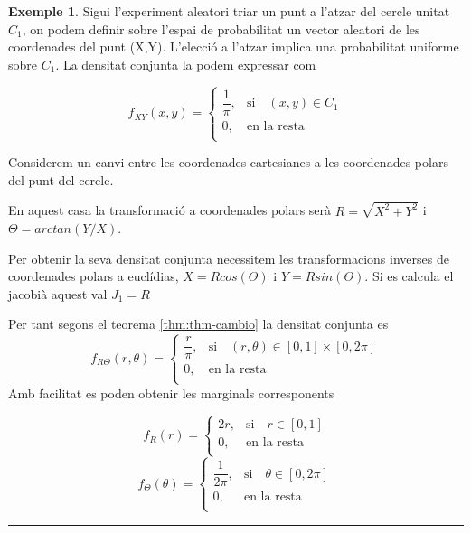 \documentclass[
  catalan,
]{article}
\theoremstyle{definition}
\theoremstyle{definition}
\newtheorem{example}{Exemple}[section]
\theoremstyle{definition}
\theoremstyle{definition}
\theoremstyle{remark}
\begin{document}
\begin{example}
\protect\hypertarget{exm:circulo}{}\label{exm:circulo}Sigui l'experiment aleatori triar un punt a l'atzar del cercle unitat \(C_1\), on podem definir sobre l'espai de probabilitat un vector aleatori de les coordenades del punt (X,Y). L'elecció a l'atzar implica una probabilitat uniforme sobre \(C_1\). La densitat conjunta la podem expressar com

\[
 f_{XY}(x,y)=
 \begin{cases}
\dfrac{1}{\pi},          & \text{si} \quad (x,y) \in C_1 \\
0,          & \text{en la resta }  \\
\end{cases}
 \]

Considerem un canvi entre les coordenades cartesianes a les coordenades polars del punt del cercle.

En aquest casa la transformació a coordenades polars serà \(R= \sqrt{X^2+Y^2}\) i \(\Theta=arctan (Y/X)\).

Per obtenir la seva densitat conjunta necessitem les transformacions inverses de coordenades polars a euclídias, \(X=R cos(\Theta)\) i \(Y=R sin(\Theta)\). Si es calcula el jacobià aquest val \(J_1=R\)

Per tant segons el teorema \ref{thm:thm-cambio} la densitat conjunta es
\[
 f_{R\Theta}(r,\theta)=
 \begin{cases}
\dfrac{r}{\pi},          & \text{si} \quad (r,\theta) \in [0,1] \times[0,2\pi]  \\
0,          & \text{en la resta }  \\
\end{cases}
 \]
Amb facilitat es poden obtenir les marginals corresponents

\[
 f_{R}(r)=
 \begin{cases}
2r,          & \text{si} \quad r \in [0,1]   \\
0,          & \text{en la resta }  \\
\end{cases}
 \]
\[
 f_{\Theta}(\theta)=
 \begin{cases}
\dfrac{1}{2\pi},          & \text{si} \quad \theta \in [0,2\pi]  \\
0,          & \text{en la resta }  \\
\end{cases}
 \]
\end{example}

\begin{center}\rule{0.5\linewidth}{0.5pt}\end{center}
\end{document}
